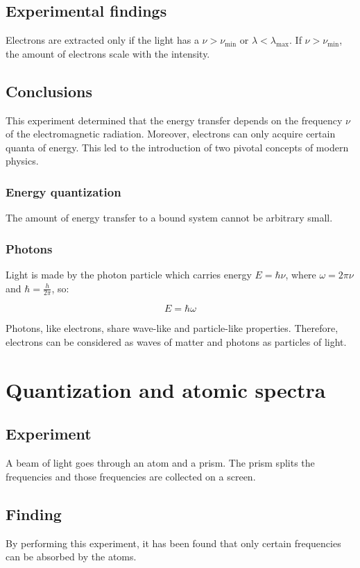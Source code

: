   \subsection{Experimental findings}
  Electrons are extracted only if the light has a $\nu > \nu_{\min}$ or $\lambda<\lambda_{\max}$.
  If $\nu>\nu_{\min}$, the amount of electrons scale with the intensity.

  \subsection{Conclusions}
  This experiment determined that the energy transfer depends on the frequency $\nu$ of the electromagnetic radiation.
  Moreover, electrons can only acquire certain quanta of energy.
  This led to the introduction of two pivotal concepts of modern physics.

    \subsubsection{Energy quantization}
    The amount of energy transfer to a bound system cannot be arbitrary small.

    \subsubsection{Photons}
    Light is made by the photon particle which carries energy $E = \hbar\nu$, where $\omega = 2\pi\nu$ and $\hbar = \frac{h}{2\pi}$, so:

    $$E = \hbar\omega$$

    Photons, like electrons, share wave-like and particle-like properties.
    Therefore, electrons can be considered as waves of matter and photons as particles of light.

\section{Quantization and atomic spectra}

  \subsection{Experiment}
  A beam of light goes through an atom and a prism.
  The prism splits the frequencies and those frequencies are collected on a screen.

  \subsection{Finding}
  By performing this experiment, it has been found that only certain frequencies can be absorbed by the atoms.

